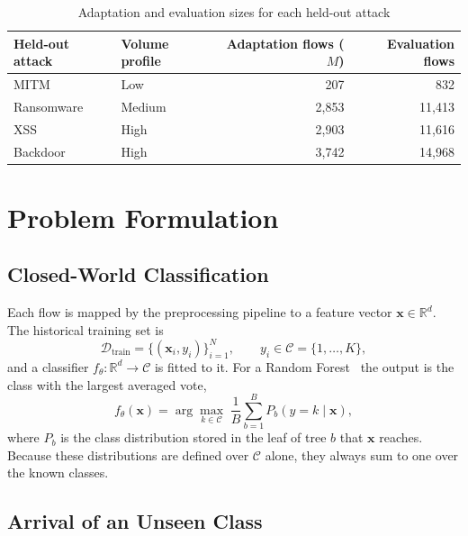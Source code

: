\begin{table}[htpb]
\centering
\small
\renewcommand{\arraystretch}{1.3}
\caption{Adaptation and evaluation sizes for each held-out attack}
\label{tab:loao_splits}
\begin{tabular}{|l|l|r|r|}
\hline
\textbf{Held-out attack} & \textbf{Volume profile} & \textbf{Adaptation flows ($M$)} & \textbf{Evaluation flows} \\ \hline
MITM       & Low    & 207      & 832 \\
Ransomware & Medium & 2{,}853  & 11{,}413 \\
XSS        & High   & 2{,}903  & 11{,}616 \\
Backdoor   & High   & 3{,}742  & 14{,}968 \\ \hline
\end{tabular}
\end{table}

\section{Problem Formulation}
\label{sec:formulation}

\subsection{Closed-World Classification}
\label{subsec:closed_world_formulation}

Each flow is mapped by the preprocessing pipeline to a feature vector $\mathbf{x} \in \mathbb{R}^d$. The historical training set is
\begin{equation}
\mathcal{D}_{\text{train}} = \{(\mathbf{x}_i, y_i)\}_{i=1}^{N}, \qquad y_i \in \mathcal{C} = \{1, \dots, K\},
\end{equation}
and a classifier $f_\theta : \mathbb{R}^d \rightarrow \mathcal{C}$ is fitted to it. For a Random Forest~\cite{breiman2001random} the output is the class with the largest averaged vote,
\begin{equation}
f_\theta(\mathbf{x}) = \arg\max_{k \in \mathcal{C}} \; \frac{1}{B} \sum_{b=1}^{B} P_b(y = k \mid \mathbf{x}),
\end{equation}
where $P_b$ is the class distribution stored in the leaf of tree $b$ that $\mathbf{x}$ reaches. Because these distributions are defined over $\mathcal{C}$ alone, they always sum to one over the known classes.

\subsection{Arrival of an Unseen Class}
\label{subsec:open_world_formulation}

